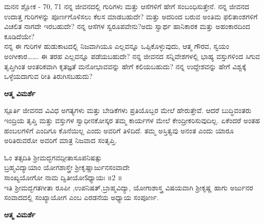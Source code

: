 \newpage
\begin{mananam}{\kanfont ಮನನ ಶ್ಲೋಕ - \textenglish{70, 71}}
\footnotesize \mananamfont ನನ್ನ ಜೀವನದಲ್ಲಿ ಗುರಿಗಳು ಮತ್ತು ಆಸೆಗಳಿಗೆ ಹೇಗೆ ಸಂಬಂಧಿಸುತ್ತೇನೆ. ನನ್ನ ಜೀವನದ ಉದಾತ್ತ   ಗುರಿಗಳನ್ನು ಪೂರ್ಣಗೊಳಿಸಲು ಕೆಲಸ ಮಾಡಬಹುದೇ? ಮತ್ತು ಅದರಿಂದ ಬರುವ ಅಂತಿಮ ಫಲಿತಾಂಶಗಳಿಗೆ ವಿಚಲಿತ ನಾಗದೇ ಇರಬಹುದೇ? ನನ್ನ ಆಸೆಗಳ ಸ್ವರೂಪವೇನು?ಅದು ಸ್ವಾರ್ಥ ಹಾನಿಕಾರಕ ಮತ್ತು ಅಹಂಕಾರದಿಂದ ಕೂಡಿದೆಯೇ?\\
ನನ್ನ ಈ ಗುರಿಗಳ ಹುಡುಕಾಟದಲ್ಲಿ ನಿಜವಾಗಿಯೂ ಎಲ್ಲವನ್ನೂ ಒಪ್ಪಿಕೊಳ್ಳುವುದು, ಆತ್ಮ ಗೌರವ, ಸ್ವಯಂ  ಅಂಗೀಕಾರ……. ಈ ತರಹ ಎಲ್ಲವನ್ನೂ ಪಡೆಯಬಹುದೇ? ನನ್ನ ಜೀವನದ ಸನ್ನಿವೇಶಗಳಲ್ಲಿ ಭಾಹ್ಯ ವಸ್ತುಗಳಿಂದ ಸಿಗುವ ತೃಪ್ತಿಗಿಂತ ಆಂತರಿಕವಾಗಿ ಕೃತಜ್ಞತೆ ಮನೋಭಾವವನ್ನು ಹೇಗೆ ಕಲಿಯಬಹುದು? ನನ್ನ ಉದ್ದೇಶವನ್ನು ಹೇಗೆ ವಿಶ್ವಕ್ಕೆ ಒಳ್ಳೆಯದಾಗುವ ರೀತಿ ತಿರುಗಿಸಬಹುದು?
\end{mananam}
\WritingHand\enspace\textbf{ಆತ್ಮ ವಿಮರ್ಶೆ}
\begin{inspiration}{\kanfont ಸ್ಪೂರ್ತಿ}
\footnotesize \mananamfont ಜೀವನದ ವಿವಿಧ ಅಗತ್ಯಗಳು ಮತ್ತು ಬೇಡಿಕೆಗಳು ಪ್ರತಿಯೊಬ್ಬರ ಮೇಲೆ ಹೇರುತ್ತೇವೆ. ಆದರೆ ಬುದ್ಧಿವಂತರು ಇಂದ್ರಿಯ ತೃಪ್ತಿ ಮತ್ತು ವಸ್ತುಗಳ ಸ್ವಾಧೀನಕೋಸ್ಕರ  ತಮ್ಮ ಕಾರ್ಯಗಳ ಮೇಲೆ ಕೇಂದ್ರೀಕರಿಸುವುದಿಲ್ಲ. ಏಕೆಂದರೆ ಅಂತಹ ಹಂಬಲಗಳಿಗೆ ಎಂದಿಗೂ ಕೊನೆಯಿಲ್ಲ ಎಂದು ಅವರಿಗೆ ತಿಳಿದಿದೆ. ತಮ್ಮ ಅಸ್ತಿತ್ವವು ಅನಂತ ಎಂದು ಯಾರೂ ಅರಿತಿರುವರೋ ಅವರಿಗೆ ಮಾತ್ರ ನಿಜವಾದ ಸಂತೃಪ್ತಿ.
\end{inspiration}
\newpage


\begin{center}
{\tiny\color{brown}
ಓಂ ತತ್ಸದಿತಿ ಶ್ರೀಮದ್ಭಗವದ್ಗೀತಾಸೂಪನಿಷತ್ಸು \\
ಬ್ರಹ್ಮವಿದ್ಯಾಯಾಂ ಯೋಗಶಾಸ್ತ್ರೇ ಶ್ರೀಕೃಷ್ಣಾರ್ಜುನಸಂವಾದೇ\\
ಸಾಂಖ್ಯಯೋಗೋ ನಾಮ ದ್ವಿತೀಯೋऽಧ್ಯಾಯಃ ॥2 ॥\\
ಇತಿ ಶ್ರೀಮದ್ಭಗತಗೀತಾ ರೂಪೀ ,ಉಪನಿಷತ್,ಬ್ರಾಹ್ಮವಿದ್ಯಾ, ಯೋಗಾಶಾಸ್ತ್ರ ವಿಷಯವಾಗಿ ಶ್ರೀಕೃಷ್ಣ ಹಾಗು ಅರ್ಜುನರ ಸಂವಾದದಲ್ಲಿ ಸಂಖ್ಯಾಯೋಗ ಎಂಬ ಎರಡನೆಯ ಅಧ್ಯಾಯ ಸಂಪೂರ್ಣ.}
\end{center}
\WritingHand\enspace\textbf{ಆತ್ಮ ವಿಮರ್ಶೆ}